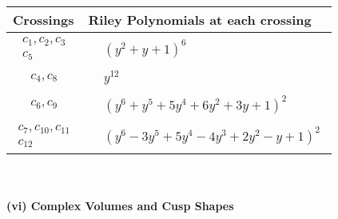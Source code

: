 \documentclass[1p]{elsarticle_modified}
\theoremstyle{definition}
\begin{document}
\begin{tabular}{m{50pt}|m{274pt}}
Crossings & \hspace{64pt}Riley Polynomials at each crossing \\
\hline $$\begin{aligned}c_{1},c_{2},c_{3}\\c_{5}\end{aligned}$$&$\begin{aligned}
&(y^2+y+1)^6
\end{aligned}$\\
\hline $$\begin{aligned}c_{4},c_{8}\end{aligned}$$&$\begin{aligned}
&y^{12}
\end{aligned}$\\
\hline $$\begin{aligned}c_{6},c_{9}\end{aligned}$$&$\begin{aligned}
&(y^6+y^5+5 y^4+6 y^2+3 y+1)^2
\end{aligned}$\\
\hline $$\begin{aligned}c_{7},c_{10},c_{11}\\c_{12}\end{aligned}$$&$\begin{aligned}
&(y^6-3 y^5+5 y^4-4 y^3+2 y^2- y+1)^2
\end{aligned}$\\
\hline
\end{tabular}\\~\\
\newpage\flushleft \textbf{(vi) Complex Volumes and Cusp Shapes}
\end{document}
